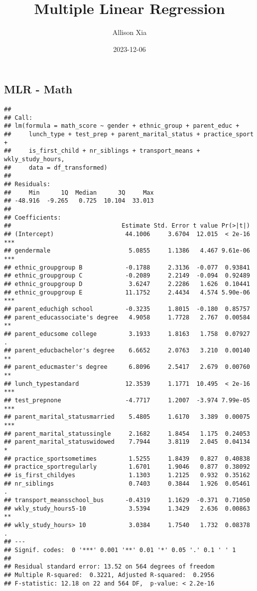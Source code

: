\documentclass[
  12pt,
]{article}
\title{Multiple Linear Regression}
\author{Allison Xia}
\date{2023-12-06}
\begin{document}
\maketitle

\hypertarget{mlr---math}{%
\subsection{MLR - Math}\label{mlr---math}}

\begin{verbatim}
## 
## Call:
## lm(formula = math_score ~ gender + ethnic_group + parent_educ + 
##     lunch_type + test_prep + parent_marital_status + practice_sport + 
##     is_first_child + nr_siblings + transport_means + wkly_study_hours, 
##     data = df_transformed)
## 
## Residuals:
##     Min      1Q  Median      3Q     Max 
## -48.916  -9.265   0.725  10.104  33.013 
## 
## Coefficients:
##                               Estimate Std. Error t value Pr(>|t|)    
## (Intercept)                    44.1006     3.6704  12.015  < 2e-16 ***
## gendermale                      5.0855     1.1386   4.467 9.61e-06 ***
## ethnic_groupgroup B            -0.1788     2.3136  -0.077  0.93841    
## ethnic_groupgroup C            -0.2089     2.2149  -0.094  0.92489    
## ethnic_groupgroup D             3.6247     2.2286   1.626  0.10441    
## ethnic_groupgroup E            11.1752     2.4434   4.574 5.90e-06 ***
## parent_educhigh school         -0.3235     1.8015  -0.180  0.85757    
## parent_educassociate's degree   4.9058     1.7728   2.767  0.00584 ** 
## parent_educsome college         3.1933     1.8163   1.758  0.07927 .  
## parent_educbachelor's degree    6.6652     2.0763   3.210  0.00140 ** 
## parent_educmaster's degree      6.8096     2.5417   2.679  0.00760 ** 
## lunch_typestandard             12.3539     1.1771  10.495  < 2e-16 ***
## test_prepnone                  -4.7717     1.2007  -3.974 7.99e-05 ***
## parent_marital_statusmarried    5.4805     1.6170   3.389  0.00075 ***
## parent_marital_statussingle     2.1682     1.8454   1.175  0.24053    
## parent_marital_statuswidowed    7.7944     3.8119   2.045  0.04134 *  
## practice_sportsometimes         1.5255     1.8439   0.827  0.40838    
## practice_sportregularly         1.6701     1.9046   0.877  0.38092    
## is_first_childyes               1.1303     1.2125   0.932  0.35162    
## nr_siblings                     0.7403     0.3844   1.926  0.05461 .  
## transport_meansschool_bus      -0.4319     1.1629  -0.371  0.71050    
## wkly_study_hours5-10            3.5394     1.3429   2.636  0.00863 ** 
## wkly_study_hours> 10            3.0384     1.7540   1.732  0.08378 .  
## ---
## Signif. codes:  0 '***' 0.001 '**' 0.01 '*' 0.05 '.' 0.1 ' ' 1
## 
## Residual standard error: 13.52 on 564 degrees of freedom
## Multiple R-squared:  0.3221, Adjusted R-squared:  0.2956 
## F-statistic: 12.18 on 22 and 564 DF,  p-value: < 2.2e-16
\end{verbatim}
\end{document}

